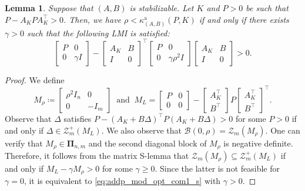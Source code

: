 \documentclass[9pt,shortpaper,twoside,web]{ieeecolor}
\newtheorem{lemma}[theorem]{Lemma}
\begin{document}
\begin{lemma}
\label{lem:mod_slem}
Suppose that $(A,B)$ is stabilizable. Let $K$ and $P>0$ be such that $P-A_KPA_K^\top>0$. Then, we have $\rho<\kappa_{(A,B)}^{\text{a}}(P,K)$ \emph{if and only if} there exists $\gamma> 0$ such that the following LMI is satisfied:
\begin{equation}
\label{eq:addp_mod_opt_com1_s}
    \begin{bmatrix}
         P & 0 \\ 0 & \gamma I
    \end{bmatrix}-\begin{bmatrix}
        A_K & B \\ I & 0 
    \end{bmatrix}^\top \begin{bmatrix}
         P & 0 \\ 0 & \gamma \rho^2 I 
    \end{bmatrix}\begin{bmatrix}
        A_K & B \\ I & 0
    \end{bmatrix}> 0.
\end{equation}
\end{lemma}
\begin{proof}
We define
\begin{equation}
\label{eq:Mrho_s}
M_\rho \coloneqq \begin{bmatrix}
\rho^2 I_n & 0 \\
0 & -I_m
\end{bmatrix} \ \text{ and } \
M_L= \begin{bmatrix}
    P & 0 \\
    0 & 0
    \end{bmatrix}\!-\!\begin{bmatrix}
    A_K^\top \\
    B^\top
    \end{bmatrix}\! P \!\begin{bmatrix}
    A_K^\top \\
    B^\top
    \end{bmatrix}^\top.
\end{equation}
Observe that $\Delta$ satisfies $P-(A_K+B\Delta)^\top P (A_K+B\Delta) > 0$ for some $P>0$ if and only if $\Delta\in\mathcal{Z}^+_{m}(M_{L})$. We also observe that $\mathcal{B}(0,\rho)=\mathcal{Z}_{m}(M_\rho)$. One can verify that $M_\rho \in \pmb{\Pi}_{n,m}$ and the second diagonal block of $M_\rho$ is negative definite. Therefore, it follows from the matrix S-lemma \cite[Thm. 4.10]{HenkQMI2023} that $\mathcal{Z}_{m}(M_\rho)\subseteq\mathcal{Z}_{m}^+(M_L)$ if and only if  $M_L-\gamma M_\rho> 0$ for some $\gamma\geq 0$. Since the latter is not feasible for $\gamma=0$, it is equivalent to \eqref{eq:addp_mod_opt_com1_s} with $\gamma>0$. 
\end{proof}
\end{document}
